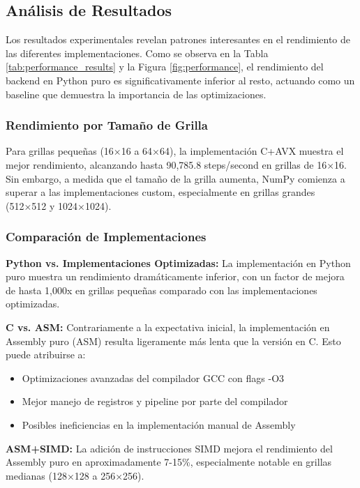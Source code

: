\documentclass[a4paper]{article}
\begin{document}
\subsection{Análisis de Resultados}

Los resultados experimentales revelan patrones interesantes en el rendimiento de las diferentes implementaciones. Como se observa en la Tabla \ref{tab:performance_results} y la Figura \ref{fig:performance}, el rendimiento del backend en Python puro es significativamente inferior al resto, actuando como un baseline que demuestra la importancia de las optimizaciones.

\subsubsection{Rendimiento por Tamaño de Grilla}

Para grillas pequeñas (16×16 a 64×64), la implementación C+AVX muestra el mejor rendimiento, alcanzando hasta 90,785.8 steps/second en grillas de 16×16. Sin embargo, a medida que el tamaño de la grilla aumenta, NumPy comienza a superar a las implementaciones custom, especialmente en grillas grandes (512×512 y 1024×1024).

\subsubsection{Comparación de Implementaciones}

\textbf{Python vs. Implementaciones Optimizadas:} La implementación en Python puro muestra un rendimiento dramáticamente inferior, con un factor de mejora de hasta 1,000x en grillas pequeñas comparado con las implementaciones optimizadas.

\textbf{C vs. ASM:} Contrariamente a la expectativa inicial, la implementación en Assembly puro (ASM) resulta ligeramente más lenta que la versión en C. Esto puede atribuirse a:
\begin{itemize}
    \item Optimizaciones avanzadas del compilador GCC con flags -O3
    \item Mejor manejo de registros y pipeline por parte del compilador
    \item Posibles ineficiencias en la implementación manual de Assembly
\end{itemize}

\textbf{ASM+SIMD:} La adición de instrucciones SIMD mejora el rendimiento del Assembly puro en aproximadamente 7-15\%, especialmente notable en grillas medianas (128×128 a 256×256).
\end{document}
